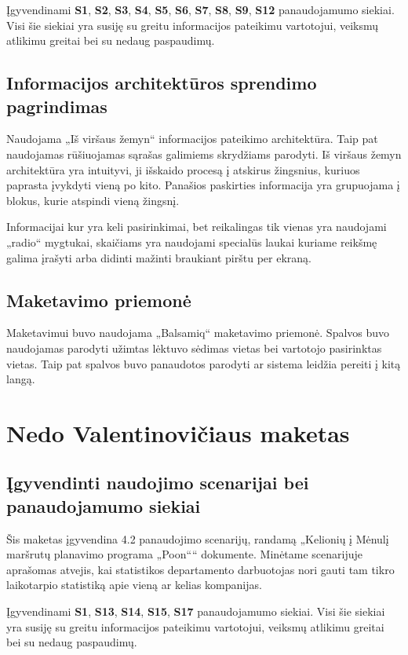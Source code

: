 \documentclass{VUMIFPSkursinis}
\begin{document}
Įgyvendinami \textbf{S1}, \textbf{S2}, \textbf{S3}, \textbf{S4}, \textbf{S5}, \textbf{S6}, \textbf{S7}, \textbf{S8}, \textbf{S9}, \textbf{S12} panaudojamumo siekiai. Visi šie siekiai yra susiję su greitu informacijos pateikimu vartotojui, veiksmų atlikimu greitai bei su nedaug paspaudimų.

\subsection{Informacijos architektūros sprendimo pagrindimas}
Naudojama „Iš viršaus žemyn“ informacijos pateikimo architektūra. Taip pat naudojamas rūšiuojamas sąrašas galimiems skrydžiams parodyti. Iš viršaus žemyn architektūra yra intuityvi, ji išskaido procesą į  atskirus žingsnius, kuriuos paprasta įvykdyti vieną po kito.
Panašios paskirties informacija yra grupuojama į blokus, kurie atspindi vieną žingsnį. 

Informacijai kur yra keli pasirinkimai, bet reikalingas tik vienas yra naudojami „radio“ mygtukai, skaičiams yra naudojami specialūs laukai kuriame reikšmę galima įrašyti arba didinti mažinti braukiant pirštu per ekraną. 

\subsection{Maketavimo priemonė}
Maketavimui buvo naudojama „Balsamiq“ maketavimo priemonė. Spalvos buvo naudojamas parodyti užimtas lėktuvo sėdimas vietas bei vartotojo pasirinktas vietas. Taip pat spalvos buvo panaudotos parodyti ar sistema leidžia pereiti į kitą langą.

\section{Nedo Valentinovičiaus maketas}
\subsection{Įgyvendinti naudojimo scenarijai bei panaudojamumo siekiai}
Šis maketas įgyvendina 4.2 panaudojimo scenarijų, randamą „Kelionių į Mėnulį maršrutų planavimo programa „Poon““ dokumente. Minėtame scenarijuje aprašomas atvejis, kai statistikos departamento darbuotojas nori gauti tam tikro laikotarpio statistiką apie vieną ar kelias kompanijas. 

Įgyvendinami \textbf{S1}, \textbf{S13}, \textbf{S14}, \textbf{S15}, \textbf{S17} panaudojamumo siekiai. Visi šie siekiai yra susiję su greitu informacijos pateikimu vartotojui, veiksmų atlikimu greitai bei su nedaug paspaudimų.
\end{document}
